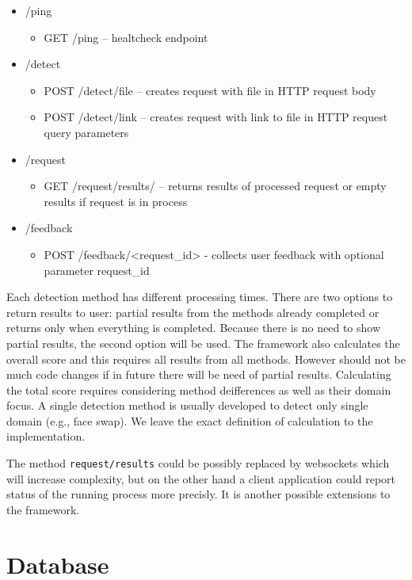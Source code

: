 \begin{itemize}
    \item /ping
    \begin{itemize}
        \item GET /ping – healtcheck endpoint
    \end{itemize}
    \item /detect
    \begin{itemize}
        \item POST /detect/file – creates request with file in HTTP request body
        \item POST /detect/link – creates request with link to file in HTTP request query parameters
    \end{itemize}
    \item /request
    \begin{itemize}
        \item GET /request/results/ – returns results of processed request or empty results if request is in process
    \end{itemize}
    \item /feedback
    \begin{itemize}
        \item POST /feedback/<request\_id> - collects user feedback with optional parameter request\_id
    \end{itemize}
\end{itemize}

Each detection method has different processing times. There are two options to return results to user: partial results from the methods already completed or returns only when everything is completed. Because there is no need to show partial results, the second option will be used. The framework also calculates the overall score and this requires all results from all methods. However should not be much code changes if in future there will be need of partial results. Calculating the total score requires considering method deifferences as well as their domain focus. A single detection method is usually developed to detect only single domain (e.g., face swap). We leave the exact definition of calculation to the implementation.

The method \texttt{request/results} could be possibly replaced by websockets which will increase complexity, but on the other hand a client application could report status of the running process more precisly. It is another possible extensions to the framework.

\section{Database}


